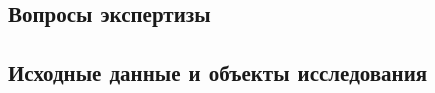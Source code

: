 \documentclass[a4paper,12pt]{article}
\begin{document}
%	
%
\pagestyle{plain}

\pagestyle{fancy}
\frenchspacing 
\fancyhf{}
\fancyhead{}
\fancyfoot{} 
%
%
%
%
\fancyhead[RE]{ } %
\fancyhead{}
\fancyhead[RE]{\small \NomerDoc} %
%

\fancyfoot[R]{\textcolor{black}{ \textit{{\small }} \rule{4cm}{0.1 mm} \hfill \rule{4cm}{0.1 mm}}}

\fancyfoot[CE]{\thepage}%
\fancyfoot[CO]{\thepage}
%
\renewcommand{\headrulewidth}{0 mm}%
\renewcommand{\headrule}{\hbox to\headwidth{%
		\color{red}\leaders\hrule height \headrulewidth\hfill}}

\renewcommand{\footrulewidth}{0 mm}%
\futurelet\TMPfootrule\def\footrule{{\color{black}\TMPfootrule}}
%
%
\thispagestyle{empty}  %
%

%






\subsection{Вопросы экспертизы}


\subsection{Исходные данные и объекты исследования}

\end{document}
